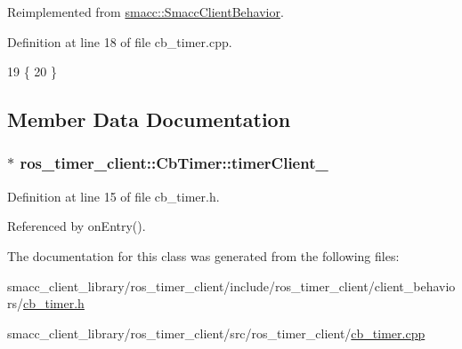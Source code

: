 Reimplemented from \hyperlink{classsmacc_1_1SmaccClientBehavior_ac0cd72d42bd00425362a97c9803ecce5}{smacc\+::\+Smacc\+Client\+Behavior}.



Definition at line 18 of file cb\+\_\+timer.\+cpp.


\begin{DoxyCode}
19 \{
20 \}
\end{DoxyCode}


\subsection{Member Data Documentation}
\subsubsection[{\texorpdfstring{timer\+Client\+\_\+}{timerClient_}}]{$\ast$ ros\+\_\+timer\+\_\+client\+::\+Cb\+Timer\+::timer\+Client\+\_\+\hspace{0.3cm}{\ttfamily [private]}}\hypertarget{classros__timer__client_1_1CbTimer_ab942aa9bdb7d4f3d2b4762c07dccacb2}{}\label{classros__timer__client_1_1CbTimer_ab942aa9bdb7d4f3d2b4762c07dccacb2}


Definition at line 15 of file cb\+\_\+timer.\+h.



Referenced by on\+Entry().



The documentation for this class was generated from the following files\+:\begin{DoxyCompactItemize}
\item 
smacc\+\_\+client\+\_\+library/ros\+\_\+timer\+\_\+client/include/ros\+\_\+timer\+\_\+client/client\+\_\+behaviors/\hyperlink{ros__timer__client_2include_2ros__timer__client_2client__behaviors_2cb__timer_8h}{cb\+\_\+timer.\+h}\item 
smacc\+\_\+client\+\_\+library/ros\+\_\+timer\+\_\+client/src/ros\+\_\+timer\+\_\+client/\hyperlink{cb__timer_8cpp}{cb\+\_\+timer.\+cpp}\end{DoxyCompactItemize}
